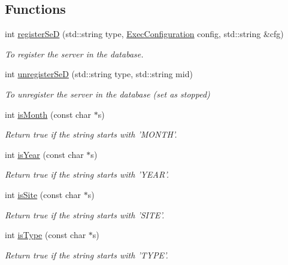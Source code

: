 \subsection*{Functions}
\begin{DoxyCompactItemize}
\item 
int \hyperlink{namespacevishnu_a9f137bd109d564a7366b3a847581d7f6}{registerSeD} (std::string type, \hyperlink{classExecConfiguration}{ExecConfiguration} config, std::string \&cfg)
\begin{DoxyCompactList}\small\item\em To register the server in the database. \item\end{DoxyCompactList}\item 
int \hyperlink{namespacevishnu_ac55cf69f136045543c4586d42e3731a7}{unregisterSeD} (std::string type, std::string mid)
\begin{DoxyCompactList}\small\item\em To unregister the server in the database (set as stopped) \item\end{DoxyCompactList}\item 
int \hyperlink{namespacevishnu_ae3f61f1465ef34d3cf2f20c67a019b43}{isMonth} (const char $\ast$s)
\begin{DoxyCompactList}\small\item\em Return true if the string starts with 'MONTH'. \item\end{DoxyCompactList}\item 
int \hyperlink{namespacevishnu_a646794297931366c08502e5079154ccd}{isYear} (const char $\ast$s)
\begin{DoxyCompactList}\small\item\em Return true if the string starts with 'YEAR'. \item\end{DoxyCompactList}\item 
int \hyperlink{namespacevishnu_a36b8edc2218c332a4a59f2e39109d627}{isSite} (const char $\ast$s)
\begin{DoxyCompactList}\small\item\em Return true if the string starts with 'SITE'. \item\end{DoxyCompactList}\item 
int \hyperlink{namespacevishnu_abaf2c02608b3d96f1f883d65966595a5}{isType} (const char $\ast$s)
\begin{DoxyCompactList}\small\item\em Return true if the string starts with 'TYPE'. \item\end{DoxyCompactList}\item 

\end{DoxyCompactItemize}
